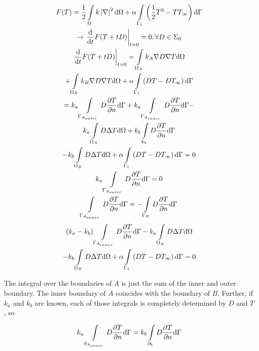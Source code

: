 \begin{gather*}
F(T) = \frac{1}{2}\int\displaylimits_{\Omega}k\left|\nabla\right|^2\mathrm{d}\Omega + \alpha \int\displaylimits_{\Gamma_1}\left(\frac{1}{2}T^2-TT_{\infty}\right)\mathrm{d}\Gamma\\
\rightarrow \left.\frac{\mathrm{d}}{\mathrm{d}t}F(T+tD)\right|_{t=0} = 0, \forall D \in \Sigma_0\\
\left.\frac{\mathrm{d}}{\mathrm{d}t}F(T+tD)\right|_{t=0} =  \int\displaylimits_{\Omega_A}k_A\nabla D \nabla T \mathrm{d}\Omega\\ + \int\displaylimits_{\Omega_B}k_B\nabla D \nabla T \mathrm{d}\Omega + \alpha \int\displaylimits_{\Gamma_1}\left(DT-DT_{\infty}\right)\mathrm{d}\Gamma\\
= k_a\int\displaylimits_{\Gamma_{A_{outer}}}D\frac{\partial T}{\partial n}\mathrm{d}\Gamma + k_a\int\displaylimits_{\Gamma_{A_{inner}}}D\frac{\partial T}{\partial n}\mathrm{d}\Gamma - \\
k_a\int\displaylimits_{\Omega_A}D\Delta T \mathrm{d}\Omega + k_b \int\displaylimits_{k_b}D\frac{\partial T}{\partial n}\mathrm{d}\Gamma \\- k_b\int\displaylimits_{\Omega_B}D\Delta T \mathrm{d}\Omega + \alpha \int\displaylimits_{\Gamma_1}\left(DT-DT_{\infty}\right)\mathrm{d}\Gamma = 0\\
k_a\int\displaylimits_{\Gamma_{A_{outer}}}D\frac{\partial T}{\partial n}\mathrm{d}\Gamma = 0\\
\int\displaylimits_{\Gamma_{A_{inner}}}D\frac{\partial T}{\partial n}\mathrm{d}\Gamma = -\int\displaylimits_{\Gamma_{B}}D\frac{\partial T}{\partial n}\mathrm{d}\Gamma
\end{gather*}
\begin{gather*}
\left(k_a-k_b\right)\int\displaylimits_{\Gamma_{A_{inner}}}D\frac{\partial T}{\partial n}\mathrm{d}\Gamma - k_a\int\displaylimits_{\Omega_A}D\Delta T \mathrm{d}\Omega\\ - k_b\int\displaylimits_{\Omega_B}D\Delta T \mathrm{d}\Omega + \alpha \int\displaylimits_{\Gamma_1}\left(DT-DT_{\infty}\right)\mathrm{d}\Gamma = 0\\
\end{gather*}

The integral over the boundaries of $A$ is just the sum of the inner and outer boundary. The inner boundary of $A$ coincides with the boundary of $B$. Further, if $k_a$ and $k_b$ are known, each of those integrals is completely determined by $D$ and $T$, so 

\begin{gather*}
k_a\int\displaylimits_{\partial_{A_{inner}}}D\frac{\partial T}{\partial n} \mathrm{d}\Gamma = k_b\int\displaylimits_{\partial_{b}}D\frac{\partial T}{\partial n} \mathrm{d}\Gamma
\end{gather*}

